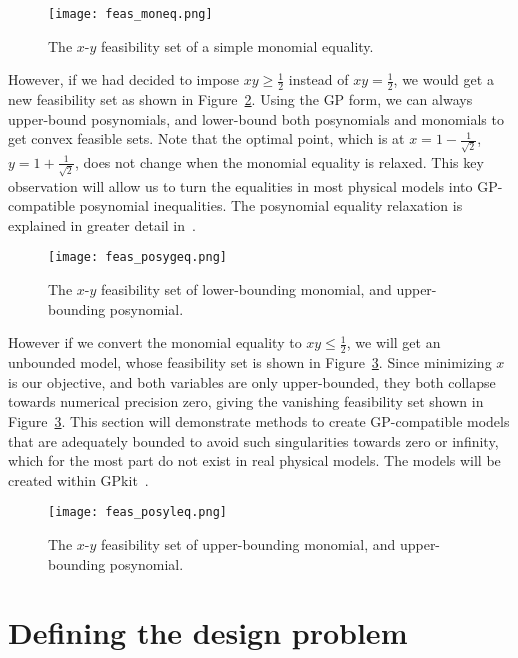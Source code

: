 \begin{figure}
    \centering
    \texttt{[image: feas\_moneq.png]}
    \caption{The $x$-$y$ feasibility set of a simple monomial equality.}
    \label{f:feas_moneq}
\end{figure}

However, if we had decided to impose $xy \geq \frac{1}{2}$ instead of $xy = \frac{1}{2}$,
we would get a new feasibility set as shown in Figure~\ref{f:feas_posygeq}.
Using the \gls{GP} form, we can always upper-bound posynomials, and lower-bound both posynomials
and monomials to get convex feasible sets. Note that the optimal point, which is at
$x = 1 - \frac{1}{\sqrt{2}}$, $y = 1 + \frac{1}{\sqrt{2}}$,
does not change when the monomial equality is relaxed. This key
observation will allow us to turn the equalities in most physical models into \gls{GP}-compatible
posynomial inequalities. The posynomial equality relaxation is explained in greater detail
in~\cite{hoburg_thesis}.

\begin{figure}
    \centering
    \texttt{[image: feas\_posygeq.png]}
    \caption{The $x$-$y$ feasibility set of lower-bounding monomial,
    and upper-bounding posynomial.}
    \label{f:feas_posygeq}
\end{figure}

However if we convert the monomial equality to  $xy \leq \frac{1}{2}$, we will get an unbounded model,
whose feasibility set is shown in Figure~\ref{f:feas_posyleq}.
Since minimizing $x$ is our objective, and both variables are only upper-bounded,
they both collapse towards numerical precision zero,
giving the vanishing feasibility set shown in Figure~\ref{f:feas_posyleq}. This section will
demonstrate methods to create \gls{GP}-compatible models that are adequately bounded to avoid such
singularities towards zero or infinity, which for the most part do not
exist in real physical models. The models will be created within GPkit~\cite{gpkit}.

\begin{figure}[H]
    \centering
    \texttt{[image: feas\_posyleq.png]}
    \caption{The $x$-$y$ feasibility set of upper-bounding monomial,
    and upper-bounding posynomial.}
    \label{f:feas_posyleq}
\end{figure}

\section{Defining the design problem}

